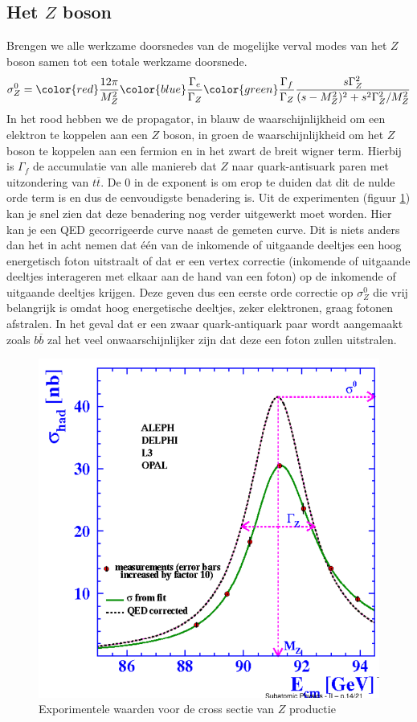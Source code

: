 \documentclass[../main.tex]{subfiles}
\begin{document}
\subsection{Het $Z$ boson}%
\label{sub:het_z_boson}

Brengen we alle werkzame doorsnedes van de mogelijke verval modes van het $Z$ boson samen tot een totale werkzame doorsnede.
\begin{equation}
    \begin{aligned}
        \label{eq:z_werkzame_doorsnede}
        \sigma_Z^0 = {\color{red} \frac{12\pi}{M_Z^2}} {\color{blue} \frac{\Gamma_e}{\Gamma_Z}} {\color{green} \frac{\Gamma_f}{\Gamma_Z}} \frac{s\Gamma_Z^2}{(s-M_Z^2)^2 + s^2\Gamma_Z^2/M_Z^2}
    \end{aligned}
\end{equation}
In het rood hebben we de propagator, in blauw de waarschijnlijkheid om een elektron te koppelen aan een $Z$ boson, in groen de waarschijnlijkheid om het $Z$ boson te koppelen aan een fermion en in het zwart de breit wigner term. Hierbij is $\Gamma_f$ de accumulatie van alle maniereb dat $Z$ naar quark-antisuark paren met uitzondering van $t\overline t$. De 0 in de exponent is om erop te duiden dat dit de nulde orde term is en dus de eenvoudigste benadering is. Uit de experimenten (figuur \ref{fig:elektroweak_precision_tests/het_z_boson}) kan je snel zien dat deze benadering nog verder uitgewerkt moet worden. Hier kan je een QED gecorrigeerde curve naast de gemeten curve. Dit is niets anders dan het in acht nemen dat één van de inkomende of uitgaande deeltjes een hoog energetisch foton uitstraalt of dat er een vertex correctie (inkomende of uitgaande deeltjes interageren met elkaar aan de hand van een foton) op de inkomende of uitgaande deeltjes krijgen. Deze geven dus een eerste orde correctie op $\sigma_Z^0$ die vrij belangrijk is omdat hoog energetische deeltjes, zeker elektronen, graag fotonen afstralen. In het geval dat er een zwaar quark-antiquark paar wordt aangemaakt zoals $b\overline b$ zal het veel onwaarschijnlijker zijn dat deze een foton zullen uitstralen.

\begin{figure}[h]
    \centering
    \includegraphics[width=0.6\linewidth]{elektroweak_precision_tests/het_z_boson.png}
    \caption{Exporimentele waarden voor de cross sectie van $Z$ productie}%
    \label{fig:elektroweak_precision_tests/het_z_boson}
\end{figure}
\end{document}
